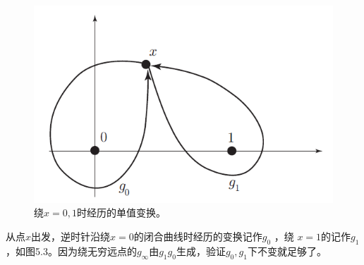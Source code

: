 \begin{figure}[h]
	\centering
	\includegraphics[width=0.6\linewidth]{fig/5.3.png}
	\caption{绕$x=0,1$时经历的单值变换。}
\end{figure}

从点$x$出发，逆时针沿绕$x=0 $的闭合曲线时经历的变换记作$g_0$ ，绕 $x=1$的记作$g_1$，如图5.3。因为绕无穷远点的$g_\infty $由$ g_1g_0 $生成，验证$g_0,g_1$下不变就足够了。


